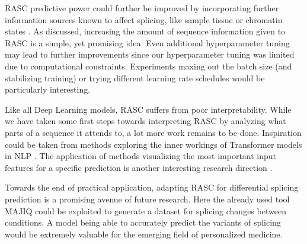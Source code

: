 RASC predictive power could further be improved by incorporating further information sources known to affect splicing, like sample tissue or chromatin states \cite{chromatin}. As discussed, increasing the amount of sequence information given to RASC is a simple, yet promising idea. 
Even additional hyperparameter tuning may lead to further improvements since our hyperparameter tuning was limited due to computational constraints. Experiments maxing out the batch size (and stabilizing training) or trying different learning rate schedules would be particularly interesting. 

Like all Deep Learning models, RASC suffers from poor interpretability. While we have taken some first steps towards interpreting RASC by analyzing what parts of a sequence it attends to, a lot more work remains to be done. 
Inspiration could be taken from methods exploring the inner workings of Transformer models in NLP \cite{interpretingbert}. The application of methods visualizing the most important input features for a specific prediction is another interesting research direction \cite{deeplift}. 
%

Towards the end of practical application, adapting RASC for differential splicing prediction is a promising avenue of future research. Here the already used tool MAJIQ could be exploited to generate a dataset for splicing changes between conditions. A model being able to accurately predict the variants of splicing would be extremely valuable for the emerging field of personalized medicine.




%
%
% 
%
%
